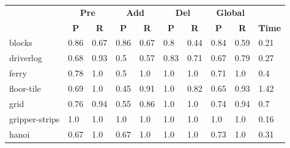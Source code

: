 \begin{table}[hbt!]
		\begin{center}
                  \begin{footnotesize}			
			\begin{tabular}{l|l|l|l|l|l|l||l|l||l|}
				& \multicolumn{2}{|c|}{\bf Pre} & \multicolumn{2}{|c|}{\bf Add} & \multicolumn{2}{|c||}{\bf Del} & \multicolumn{2}{|c|}{\bf Global} & \\ \cline{2-9}			
				& \multicolumn{1}{|c|}{\bf P} & \multicolumn{1}{|c|}{\bf R} & \multicolumn{1}{|c|}{\bf P} & \multicolumn{1}{|c|}{\bf R} & \multicolumn{1}{|c|}{\bf P} & \multicolumn{1}{|c||}{\bf R} &  \multicolumn{1}{|c|}{\bf P} & \multicolumn{1}{|c|}{\bf R} & {\bf Time} \\
				\hline
				blocks & 0.86 & 0.67 & 0.86 & 0.67 & 0.8 & 0.44 & 0.84 & 0.59& 0.21 \\ %
				driverlog & 0.68 & 0.93 & 0.5 & 0.57 & 0.83 & 0.71 & 0.67 & 0.79& 0.27 \\ %
				ferry & 0.78 & 1.0 & 0.5 & 1.0 & 1.0 & 1.0 & 0.71 & 1.0& 0.4 \\ %
				floor-tile & 0.69 & 1.0 & 0.45 & 0.91 & 1.0 & 0.82 & 0.65 & 0.93& 1.42 \\ %
				grid & 0.76 & 0.94 & 0.55 & 0.86 & 1.0 & 1.0 & 0.74 & 0.94& 0.7 \\ %
				gripper-strips & 1.0 & 1.0 & 1.0 & 1.0 & 1.0 & 1.0 & 1.0 & 1.0& 0.16 \\ %
				hanoi & 0.67 & 1.0 & 0.67 & 1.0 & 1.0 & 1.0 & 0.73 & 1.0& 0.31 \\ %

\end{tabular}
\end{footnotesize}
\end{center}
\end{table}
